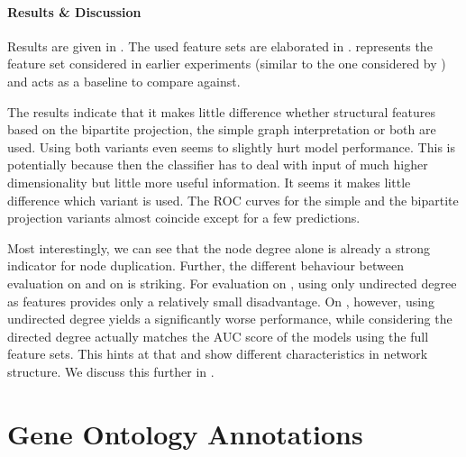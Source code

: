 \documentclass[
	fontsize=10pt, %
	twoside=true, %
	secnumdepth=1, %
  toc=indentunnumbered %
]{kaobook}
\begin{document}
\paragraph{Results \& Discussion} Results are given in
. The used feature sets are elaborated in
.  represents the feature set
considered in earlier experiments (similar to the one considered by \nielsen{})
and acts as a baseline to compare against.

The results indicate that it makes little difference whether structural features
based on the bipartite projection, the simple graph interpretation or both are
used. Using both variants even seems to slightly hurt model performance. This is
potentially because then the classifier has to deal with input of much higher
dimensionality but little more useful information.
%
It seems it makes little difference which variant is used. The ROC curves for the simple
and the bipartite projection variants almost coincide except for a few
predictions.

Most interestingly, we can see that the node degree alone is already a strong
indicator for node duplication. Further, the different behaviour between
evaluation on \PDMap{} and on \ReconMap{} is striking. 
For evaluation on \PDMap{}, using only undirected degree as
features provides only a relatively small disadvantage. On \ReconMap{}, however,
using undirected degree yields a significantly worse performance, while
considering the directed degree actually matches the AUC score of the models
using the full feature sets. This hints at that \PDMap{} and \ReconMap{} show
different characteristics in network structure. We discuss this further in
.

\section{Gene Ontology Annotations}
\label{sec:gene-ontology-annotations}




\end{document}
